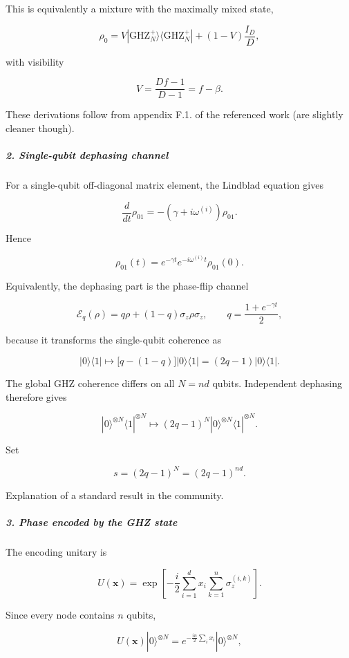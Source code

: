 This is equivalently a mixture with the maximally mixed state,

\[
\rho_0 = V|\mathrm{GHZ}_N^{+}\rangle\langle\mathrm{GHZ}_N^{+}| +(1-V)\frac{I_D}{D},
\]

with visibility

\[
V=\frac{Df-1}{D-1}=f-\beta.
\]

{\color{blue}

These derivations follow from appendix F.1. of the referenced work (are slightly cleaner though). 

}

\subparagraph*{2. Single-qubit dephasing channel}

For a single-qubit off-diagonal matrix element, the Lindblad equation gives

\[
\frac{d}{dt}\rho_{01} = -\left(\gamma+i\omega^{(i)}\right)\rho_{01}.
\]

Hence

\[
\rho_{01}(t) = e^{-\gamma t}e^{-i\omega^{(i)}t}\rho_{01}(0).
\]

Equivalently, the dephasing part is the phase-flip channel

\[
\mathcal E_q(\rho)=q\rho+(1-q)\sigma_z\rho\sigma_z, \qquad q=\frac{1+e^{-\gamma t}}{2},
\]

because it transforms the single-qubit coherence as

\[
|0\rangle\langle1| \longmapsto \bigl[q-(1-q)\bigr]|0\rangle\langle1| = (2q-1)|0\rangle\langle1|.
\]

The global GHZ coherence differs on all $N=nd$ qubits. Independent dephasing therefore gives

\[
|0\rangle^{\otimes N}\langle1|^{\otimes N} \longmapsto (2q-1)^N |0\rangle^{\otimes N}\langle1|^{\otimes N}.
\]

Set

\[
s=(2q-1)^N=(2q-1)^{nd}.
\]

{\color{blue}

Explanation of a standard result in the community. 

}

\subparagraph*{3. Phase encoded by the GHZ state}

The encoding unitary is

\[
U(\boldsymbol{x}) = \exp\left[ -\frac{i}{2} \sum_{i=1}^{d}x_i \sum_{k=1}^{n}\sigma_z^{(i,k)} \right].
\]

Since every node contains $n$ qubits,

\[
U(\boldsymbol{x})|0\rangle^{\otimes N} = e^{-\frac{in}{2}\sum_i x_i}|0\rangle^{\otimes N},
\]

